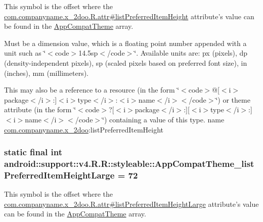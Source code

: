 This symbol is the offset where the \hyperlink{classcom_1_1companyname_1_1x__2doo_1_1_r_1_1attr_c7257c67946817a6b6d087790442ffb8}{com.companyname.x\_\-2doo.R.attr\#listPreferredItemHeight} attribute's value can be found in the \hyperlink{classandroid_1_1support_1_1v4_1_1_r_1_1styleable_0873e92ba21076bb5a4aeadeb7f5779f}{AppCompatTheme} array.

Must be a dimension value, which is a floating point number appended with a unit such as \char`\"{}$<$code$>$14.5sp$<$/code$>$\char`\"{}. Available units are: px (pixels), dp (density-independent pixels), sp (scaled pixels based on preferred font size), in (inches), mm (millimeters). 

This may also be a reference to a resource (in the form \char`\"{}$<$code$>$@\mbox{[}$<$i$>$package$<$/i$>$:\mbox{]}$<$i$>$type$<$/i$>$:$<$i$>$name$<$/i$>$$<$/code$>$\char`\"{}) or theme attribute (in the form \char`\"{}$<$code$>$?\mbox{[}$<$i$>$package$<$/i$>$:\mbox{]}\mbox{[}$<$i$>$type$<$/i$>$:\mbox{]}$<$i$>$name$<$/i$>$$<$/code$>$\char`\"{}) containing a value of this type.  name \hyperlink{namespacecom_1_1companyname_1_1x__2doo}{com.companyname.x\_\-2doo}:listPreferredItemHeight \hypertarget{classandroid_1_1support_1_1v4_1_1_r_1_1styleable_8e939e05300583b0aef1b0e9e345f506}{
\subsubsection[{AppCompatTheme\_\-listPreferredItemHeightLarge}]{\setlength{\rightskip}{0pt plus 5cm}static final int android::support::v4.R.R::styleable::AppCompatTheme\_\-listPreferredItemHeightLarge = 72}}
\label{classandroid_1_1support_1_1v4_1_1_r_1_1styleable_8e939e05300583b0aef1b0e9e345f506}


This symbol is the offset where the \hyperlink{classcom_1_1companyname_1_1x__2doo_1_1_r_1_1attr_531b566180a29eb3bd6ef33c78c86d65}{com.companyname.x\_\-2doo.R.attr\#listPreferredItemHeightLarge} attribute's value can be found in the \hyperlink{classandroid_1_1support_1_1v4_1_1_r_1_1styleable_0873e92ba21076bb5a4aeadeb7f5779f}{AppCompatTheme} array.

